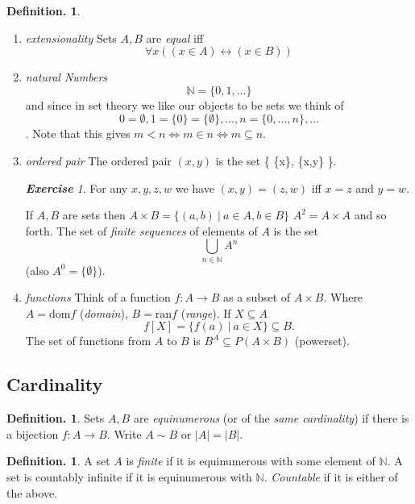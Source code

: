 \documentclass[a4paper,oneside,11pt,DIV=12,parskip=half]{scrartcl}
\newcommand{\N}{\mathbb N}
\theoremstyle{plain}
\theoremstyle{definition}
\newtheorem{definition}[theorem]{Definition.}
\newtheorem{remark, definition}[theorem]{Remark and Definition.}
\newtheorem{lemma, definition}[theorem]{Lemma and Definition.}
\newtheorem{theorem, definition}[theorem]{Theorem and Definition.}
\theoremstyle{remark}
\newtheorem*{exercise}{\textbf{Exercise}}
\newtheorem*{remark, example}{\textbf{Remark and Exercise}}
\begin{document}
\begin{definition}
\begin{enumerate}
    \item  \emph{extensionality} Sets $A,B$ are \emph{equal} iff
        \[ \forall x ((x \in A) \leftrightarrow (x \in B)) \]
    \item \emph{natural Numbers}
        \[ \N = \{0,1,\dots \} \] and since in set theory we like our objects to be sets we think of
            \[ 0 = \emptyset, 1 = \{ 0 \} = \{\emptyset\}, \dots, n = \{ 0,\dots, n \}, \dots \].
    Note that this gives $m < n \Leftrightarrow m \in n \Leftrightarrow m \subseteq n$.
    \item \emph{ordered pair}
    The ordered pair $(x,y)$ is the set
        \{ \{x\}, \{x,y\} \}.
    \begin{exercise}
        For any $x,y,z,w$ we have $(x,y) = (z,w)$ iff $x = z$ and $y = w$.
    \end{exercise}
    If $A,B$ are sets then $A \times B = \{ (a,b)~|~ a \in A, b \in B \}$
    $A^2 = A \times A$ and so forth.
    The set of \emph{finite sequences} of elements of $A$ is the set 
        \[ \bigcup_{n \in \N} A^n \]
    (also $A^0=\{\emptyset\}$).
    \item \emph{functions}
    Think of a function $f: A \rightarrow B$ as a subset of $A \times B$. Where $A = \mathrm{dom}f$ (\emph{domain}), $B = \mathrm{ran}f$ (\emph{range}).
    If $X \subseteq A$
        \[ f[X] = \{ f(a) ~|~ a \in X \} \subseteq B. \]
    The set of functions from $A$ to $B$ is $B^A \subseteq P(A \times B)$ (powerset).
\end{enumerate}
\end{definition}

\subsection{Cardinality}
\begin{definition}
Sets $A,B$ are \emph{equinumerous} (or of the \emph{same cardinality}) if there is a bijection $f: A \rightarrow B$. Write $A \sim B$ or $|A|=|B|$.
\end{definition}

\begin{definition}
A set $A$ is \emph{finite} if it is equinumerous with some element of $\N$. A set is countably infinite if it is equinumerous with $\N$. \emph{Countable} if it is either of the above.
\end{definition}
\end{document}

